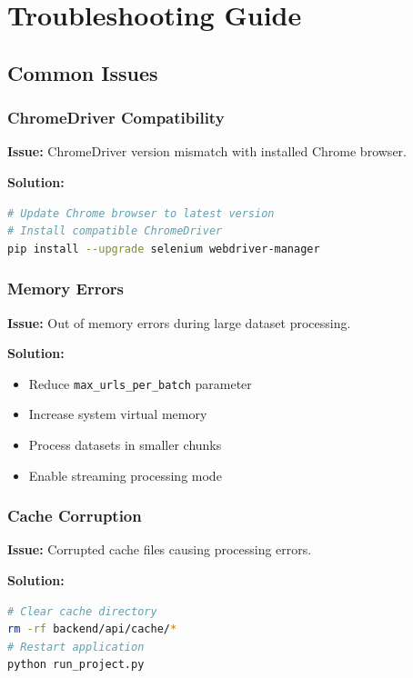 \section{Troubleshooting Guide}
\label{app:troubleshooting}

\subsection{Common Issues}

\subsubsection{ChromeDriver Compatibility}

\textbf{Issue:} ChromeDriver version mismatch with installed Chrome browser.

\textbf{Solution:}
\begin{lstlisting}[language=bash]
# Update Chrome browser to latest version
# Install compatible ChromeDriver
pip install --upgrade selenium webdriver-manager
\end{lstlisting}

\subsubsection{Memory Errors}

\textbf{Issue:} Out of memory errors during large dataset processing.

\textbf{Solution:}
\begin{itemize}
\item Reduce \texttt{max\_urls\_per\_batch} parameter
\item Increase system virtual memory
\item Process datasets in smaller chunks
\item Enable streaming processing mode
\end{itemize}

\subsubsection{Cache Corruption}

\textbf{Issue:} Corrupted cache files causing processing errors.

\textbf{Solution:}
\begin{lstlisting}[language=bash]
# Clear cache directory
rm -rf backend/api/cache/*
# Restart application
python run_project.py
\end{lstlisting} 